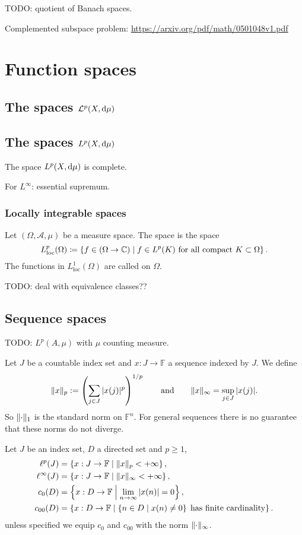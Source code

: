 TODO: quotient of Banach spaces.

Complemented subspace problem: \url{https://arxiv.org/pdf/math/0501048v1.pdf}

\section{Function spaces}
\subsection{The spaces $\mathcal{L}^p(X,\operatorname{d \!}{\mu})$}
\subsection{The spaces $L^p(X,\operatorname{d \!}{\mu})$}
\begin{theorem}
The space $L^p(X,\operatorname{d \!}{\mu})$ is complete.
\end{theorem}

For $L^\infty$: essential supremum.

\subsubsection{Locally integrable spaces}
\begin{definition}
Let $(\Omega, \mathcal{A}, \mu)$ be a measure space. The  space is the space
\[ L^p_\text{loc}(\Omega) \coloneqq \left\{ f \in (\Omega\to\mathbb{C}) \;\middle|\; \text{$f\in L^p(K)$ for all compact $K\subset \Omega$} \right\}. \]
The functions in $L^1_\text{loc}(\Omega)$ are called  on $\Omega$.
\end{definition}
TODO: deal with equivalence classes??

\subsection{Sequence spaces}
TODO:  $L^p(A,\mu)$ with $\mu$ counting measure.

Let $J$ be a countable index set and $x:J\to \mathbb{F}$ a sequence indexed by $J$. We define
\[ \lVert x\rVert_p := \left(\sum_{j\in J}|x(j)|^p\right)^{1/p} \qquad\text{and}\qquad \lVert x\rVert_\infty = \sup_{j\in J}|x(j)|. \]
So $\lVert\cdot\rVert_1$ is the standard norm on $\mathbb{F}^n$. For general sequences there is no guarantee that these norms do not diverge.
\begin{definition}
Let $J$ be an index set, $D$ a directed set and $p\geq 1$,
\begin{align*}
\ell^p(J) &= \left\{ x:J\to \mathbb{F} \;\middle|\; \lVert x\rVert_p < +\infty \right\},\\
\ell^\infty(J) &= \left\{ x:J\to \mathbb{F} \;\middle|\; \lVert x\rVert_\infty < +\infty \right\},\\
c_0(D) &= \left\{ x:D\to \mathbb{F} \;\middle|\; \lim_{n\to\infty}|x(n)| = 0 \right\}, \\
c_{00}(D) &= \left\{ x:D\to \mathbb{F} \;\middle|\; \left\{ n\in D \;\middle|\; x(n)\neq 0 \right\}\;\text{has finite cardinality} \right\}.
\end{align*}
unless specified we equip $c_0$ and $c_{00}$ with the norm $\lVert\cdot\rVert_\infty$.
\end{definition}

